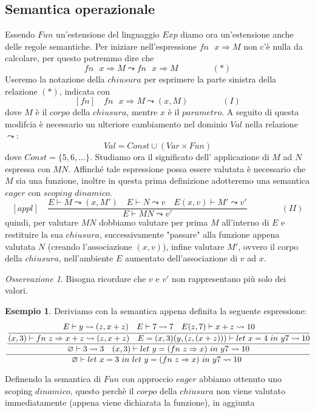 \documentclass{article}
\theoremstyle{definition}
\theoremstyle{definition}
\theoremstyle{definition}
\newtheorem{example}[theorem]{Esempio}
\theoremstyle{remark}
\newtheorem{remark}[theorem]{Osservazione}
\begin{document}
\subsection{Semantica operazionale}
Essendo $Fun$ un'estensione del linguaggio  $Exp$ diamo ora un'estensione anche delle regole semantiche. Per iniziare nell'espressione
$\text{$fn$ $x\Rightarrow M$}$  non c'è nulla da calcolare, per questo potremmo dire che
$$\text{$fn$ $x\Rightarrow M$}\leadsto \text{$fn$ $x\Rightarrow M$}\qquad \qquad(*)$$
Useremo la notazione della $chiusura$ per esprimere la parte sinistra della relazione  $(*)$, indicata con
$$[fn]\quad\text{$fn$ $x\Rightarrow M$}\leadsto (x,M)\qquad \qquad (I)$$
dove $M$ è il $corpo$ della $chiusura$, mentre $x$ è il $parametro$. A seguito di questa
modifcia è necessario un ulteriore cambiamento nel dominio $Val$ nella relazione $\leadsto$:
$$Val = Const \cup (Var\times Fun)$$
dove $Const = \{5,6,\dots\}$.
Studiamo ora il significato dell' applicazione di $M$ ad $N$ espressa con $MN$. Affinché tale espressione possa essere valutata è necessario
che $M$ sia una funzione, inoltre in questa prima definizione adotteremo una semantica $eager$ con $scoping$ $dinamico$.
$$[appl]\quad\frac{E\vdash M \leadsto (x,M') \quad E \vdash N\leadsto v \quad E(x,v)\vdash M'\leadsto v'}{E\vdash MN\leadsto v'}\qquad \qquad (II)$$
quindi, per valutare $MN$  dobbiamo valutare per prima $M$  all'interno di $E$ e restituire la sua $chiusura$, successivamente "passare"
alla funzione appena valutata $N$ (creando l'associazione $(x,v)$), infine valutare $M'$, ovvero il corpo della $chiusura$, nell'ambiente $E$ aumentato dell'associazione
di $v$ ad $x$.
\begin{remark}
    Bisogna ricordare che $v$ e $v'$ non rappresentano più solo dei valori.
\end{remark}
\begin{example}
    Deriviamo con la semantica appena definita la seguente espressione:
    $$\cfrac{\cfrac{\cfrac{E\vdash y\leadsto (z,x+z)\quad E\vdash 7\leadsto 7\quad E(z,7)\vdash x+z \leadsto 10}{(x,3)\vdash \text{$fn$ $z\Rightarrow x+z$}\leadsto (z,x+z)\quad E =(x,3)(y,(z,(x+z)))\vdash \text{$let$ $x=4$ $in$ $y7\leadsto 10$}}}
            {\varnothing\vdash 3\leadsto 3 \quad (x,3)\vdash\text{$let$ $y = (fn$ $z\Rightarrow x$) $in$ $y7\leadsto 10$}}}
        {\varnothing \vdash \text{$let$ $x=3$ $in$ $let$ $y = (fn$ $z\Rightarrow x$) $in$ $y7\leadsto 10$ }}$$
\end{example}
Definendo la semantica di $Fun$ con approccio $eager$ abbiamo ottenuto uno scoping $dinamico$, questo perchè  il $corpo$ della $chiusura$ non viene valutato immediatamente (appena viene dichiarata la funzione), in aggiunta
\end{document}

